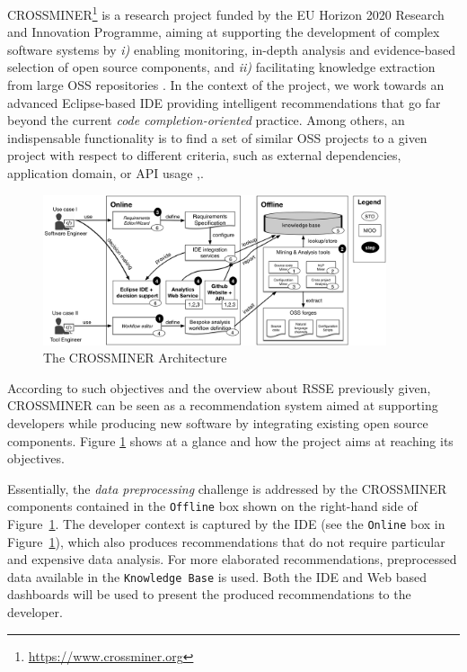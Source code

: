 CROSSMINER\footnote{\url{https://www.crossminer.org}} is a research project funded by the EU Horizon 2020 Research and Innovation Programme, aiming at supporting the development of complex software systems by \textit{i)} enabling monitoring, in-depth analysis and evidence-based selection of open source components, and \textit{ii)} facilitating knowledge extraction from large OSS repositories \cite{10.1007/978-3-319-74730-9_33}. In the context of the project, we work towards an advanced Eclipse-based IDE providing intelligent recommendations that go far beyond the current \emph{code completion-oriented} practice. Among others, an indispensable functionality is to find a set of similar OSS projects to a given project with respect to different criteria, such as external dependencies, application domain, or API usage \cite{DBLP:conf/iir/NDD013},\cite{NDRDSEAA2018}.

\begin{figure}[!h]
	\includegraphics[width=0.9\textwidth]{images/crossminer.png}
	\centering
	\caption{The CROSSMINER Architecture}
	\label{fig:CrossminerApproach}
\end{figure}

According to such objectives and the overview about RSSE previously given, CROSSMINER can be seen as a recommendation system aimed at supporting developers while producing new software by integrating existing open source components. Figure \ref{fig:CrossminerApproach} shows \CROSSMINER at a glance and how the project aims at reaching its objectives.

Essentially, the \textit{data preprocessing} challenge is addressed by the CROSSMINER components contained in the \texttt{Offline} box shown on the right-hand side of Figure~\ref{fig:CrossminerApproach}. The developer context is captured by the IDE (see the \texttt{Online} box in Figure~\ref{fig:CrossminerApproach}), which also produces recommendations that do not require particular and expensive data analysis. For more elaborated recommendations, preprocessed data available in the \texttt{Knowledge Base} is used. Both the IDE and Web based dashboards will be used to present the produced recommendations to the developer. 





